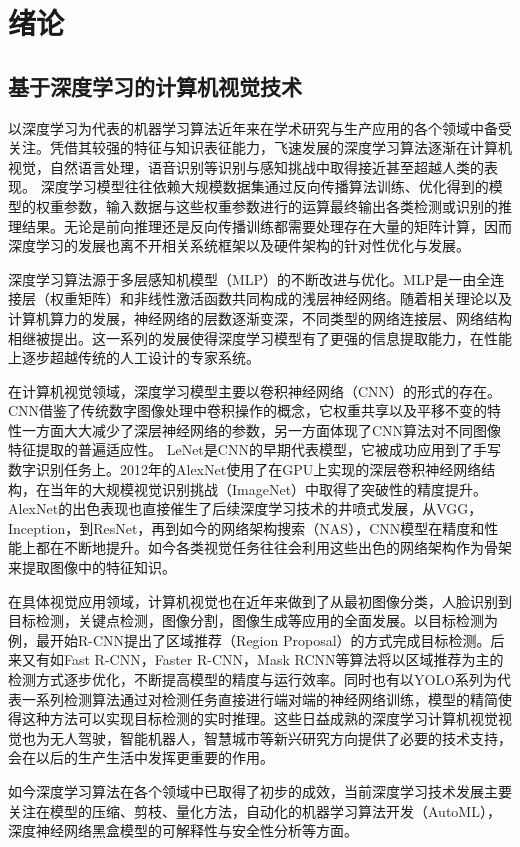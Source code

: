 
\chapter{绪论}

\section{基于深度学习的计算机视觉技术}
以深度学习为代表的机器学习算法近年来在学术研究与生产应用的各个领域中备受关注。凭借其较强的特征与知识表征能力，飞速发展的深度学习算法逐渐在计算机视觉，自然语言处理，语音识别等识别与感知挑战中取得接近甚至超越人类的表现。%
深度学习模型往往依赖大规模数据集通过反向传播算法训练、优化得到的模型的权重参数，输入数据与这些权重参数进行的运算最终输出各类检测或识别的推理结果。无论是前向推理还是反向传播训练都需要处理存在大量的矩阵计算，因而深度学习的发展也离不开相关系统框架以及硬件架构的针对性优化与发展。\par
深度学习算法源于多层感知机模型（MLP）的不断改进与优化。MLP是一由全连接层（权重矩阵）和非线性激活函数共同构成的浅层神经网络。随着相关理论以及计算机算力的发展，神经网络的层数逐渐变深，不同类型的网络连接层、网络结构相继被提出。这一系列的发展使得深度学习模型有了更强的信息提取能力，在性能上逐步超越传统的人工设计的专家系统。\par
在计算机视觉领域，深度学习模型主要以卷积神经网络（CNN）的形式的存在。CNN借鉴了传统数字图像处理中卷积操作的概念，它权重共享以及平移不变的特性一方面大大减少了深层神经网络的参数，另一方面体现了CNN算法对不同图像特征提取的普遍适应性。
LeNet是CNN的早期代表模型，它被成功应用到了手写数字识别任务上。2012年的AlexNet使用了在GPU上实现的深层卷积神经网络结构，在当年的大规模视觉识别挑战（ImageNet）中取得了突破性的精度提升。AlexNet的出色表现也直接催生了后续深度学习技术的井喷式发展，从VGG，Inception，到ResNet，再到如今的网络架构搜索（NAS），CNN模型在精度和性能上都在不断地提升。如今各类视觉任务往往会利用这些出色的网络架构作为骨架来提取图像中的特征知识。\par
在具体视觉应用领域，计算机视觉也在近年来做到了从最初图像分类，人脸识别到目标检测，关键点检测，图像分割，图像生成等应用的全面发展。以目标检测为例，最开始R-CNN提出了区域推荐（Region Proposal）的方式完成目标检测。后来又有如Fast R-CNN，Faster R-CNN，Mask RCNN等算法将以区域推荐为主的检测方式逐步优化，不断提高模型的精度与运行效率。同时也有以YOLO系列为代表一系列检测算法通过对检测任务直接进行端对端的神经网络训练，模型的精简使得这种方法可以实现目标检测的实时推理。这些日益成熟的深度学习计算机视觉视觉也为无人驾驶，智能机器人，智慧城市等新兴研究方向提供了必要的技术支持，会在以后的生产生活中发挥更重要的作用。\par
如今深度学习算法在各个领域中已取得了初步的成效，当前深度学习技术发展主要关注在模型的压缩、剪枝、量化方法，自动化的机器学习算法开发（AutoML），深度神经网络黑盒模型的可解释性与安全性分析等方面。


